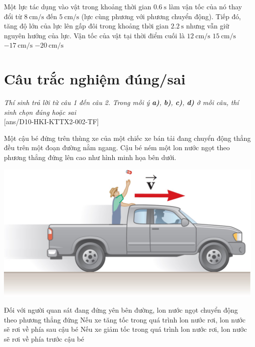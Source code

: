 \begin{ex}
	Một lực tác dụng vào vật trong khoảng thời gian $\SI{0.6}{\second}$ làm vận tốc của nó thay đổi từ $\SI{8}{\centi\meter/\second}$ đến $\SI{5}{\centi\meter/\second}$ (lực cùng phương với phương chuyển động). Tiếp đó, tăng độ lớn của lực lên gấp đôi trong khoảng thời gian $\SI{2.2}{\second}$ nhưng vẫn giữ nguyên hướng của lực. Vận tốc của vật tại thời điểm cuối là
	\choice
	{$\SI{12}{\centi\meter/\second}$}
	{$\SI{15}{\centi\meter/\second}$}
	{\True $\SI{-17}{\centi\meter/\second}$}
	{$\SI{-20}{\centi\meter/\second}$}
	\loigiai{}
\end{ex}
\section{Câu trắc nghiệm đúng/sai} 
\textit{Thí sinh trả lời từ câu 1 đến câu 2. Trong mỗi ý \textbf{a)}, \textbf{b)}, \textbf{c)}, \textbf{d)} ở mỗi câu, thí sinh chọn đúng hoặc sai}
\setcounter{ex}{0}\\
[ans/D10-HKI-KTTX2-002-TF]
\begin{ex}
	Một cậu bé đứng trên thùng xe của một chiếc xe bán tải đang chuyển động thẳng đều trên một đoạn đường nằm ngang. Cậu bé ném một lon nước ngọt theo phương thẳng đứng lên cao như hình minh họa bên dưới.
	\begin{center}
		\includegraphics[width=0.4\linewidth]{figs/D10-HKI-KTTX2-001-4}
	\end{center}
	{Đối với người quan sát đang đứng yên bên đường, lon nước ngọt chuyển động theo phương thẳng đứng}
	{\True Nếu xe tăng tốc trong quá trình lon nước rơi, lon nước sẽ rơi về phía sau cậu bé}
	{\True Nếu xe giảm tốc trong quá trình lon nước rơi, lon nước sẽ rơi về phía trước cậu bé}
	\loigiai{}
\end{ex}
